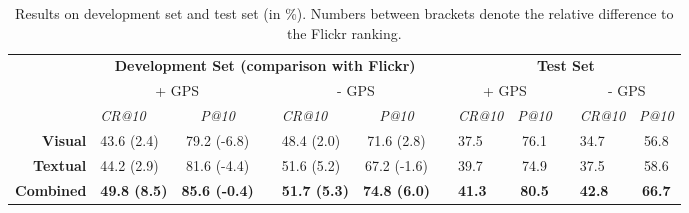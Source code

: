 \documentclass{acm_proc_article-me11_tweaked}
\begin{document}
\begin{table*}
\centering
\caption{Results on development set and test set (in \%). Numbers between brackets denote the relative difference to the Flickr ranking.}
 \begin{tabular}{|r|l|ccl|ccl|ccl|c|}
\cline{2-12}
   \multicolumn{1}{c|}{ } & \multicolumn{5}{c}{\bfseries Development Set (comparison with Flickr)}  & \vrule height2.75ex depth1.25ex width 1pt &  \multicolumn{5}{c|}{\bfseries Test Set} \\\cline{2-12}    
   \multicolumn{1}{c|}{ } & \multicolumn{2}{c}{ + GPS}  & \vrule height2.75ex depth1.25ex width 1pt & \multicolumn{2}{c}{ - GPS} & \vrule height2.75ex depth1.25ex width 1pt & \multicolumn{2}{c}{ + GPS}  & \vrule height2.75ex depth1.25ex width 1pt & \multicolumn{2}{c|}{ - GPS} \\\cline{2-12}
   \multicolumn{1}{c|}{ } &  \textit{CR@10} &   \textit{P@10} & \vrule height2.75ex depth1.25ex width 1pt &  \textit{CR@10} &  \textit{P@10} & \vrule height2.75ex depth1.25ex width 1pt &  \textit{CR@10} &   \textit{P@10} & \vrule height2.75ex depth1.25ex width 1pt &   \textit{CR@10} & \textit{P@10} \\
   \hline
   \bfseries Visual   & 43.6  (2.4) & 79.2 (-6.8) & \vrule height2.75ex depth1.25ex width 1pt & 48.4 (2.0)&  71.6 (2.8)& \vrule height2.75ex depth1.25ex width 1pt & 37.5 & 76.1 & \vrule height2.75ex depth1.25ex width 1pt & 34.7 & 56.8\\\hline
  \bfseries Textual  &  44.2  (2.9)  & 81.6 (-4.4) & \vrule height2.75ex depth1.25ex width 1pt & 51.6 (5.2) & 67.2 (-1.6)& \vrule height2.75ex depth1.25ex width 1pt &  39.7  & 74.9 & \vrule height2.75ex depth1.25ex width 1pt & 37.5 & 58.6\\\hline
  \bfseries Combined & \bfseries 49.8  (8.5) & \bfseries 85.6 (-0.4) & \vrule height2.75ex depth1.25ex width 1pt & \bfseries  51.7 (5.3)  & \bfseries 74.8  (6.0)& \vrule height2.75ex depth1.25ex width 1pt  & \bfseries 41.3 & \bfseries 80.5 & \vrule height2.75ex depth1.25ex width 1pt & \bfseries  42.8  & \bfseries 66.7 \\
    \hline
  \end{tabular}
  \label{tbl:results}

  
  
\end{table*} 
\end{document}
